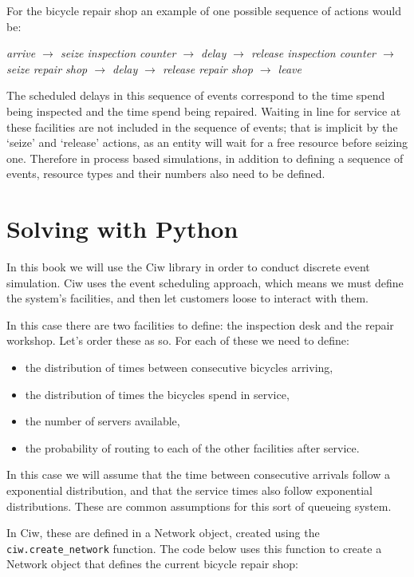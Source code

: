 For the bicycle repair shop an example of one possible sequence of actions would
be:

\textit{arrive $\rightarrow$ seize inspection counter $\rightarrow$ delay $\rightarrow$ release inspection counter $\rightarrow$ seize repair shop $\rightarrow$ delay $\rightarrow$ release repair shop $\rightarrow$ leave}

The scheduled delays in this sequence of events correspond to the time spend
being inspected and the time spend being repaired. Waiting in line for service
at these facilities are not included in the sequence of events; that is implicit
by the `seize' and `release' actions, as an entity will wait for a free resource
before seizing one.
Therefore in process based simulations, in addition to defining a sequence of
events, resource types and their numbers also need to be defined.


\section{Solving with Python}\label{sec:solving-with-python}

In this book we will use the Ciw library in order to conduct discrete event
simulation.
Ciw uses the event scheduling approach, which means we must define the system's
facilities, and then let customers loose to interact with them.

In this case there are two facilities to define: the inspection desk and the
repair workshop. Let's order these as so. For each of these we need to define:

\begin{itemize}
  \item the distribution of times between consecutive bicycles arriving,
  \item the distribution of times the bicycles spend in service,
  \item the number of servers available,
  \item the probability of routing to each of the other facilities after
  service.
\end{itemize}

In this case we will assume that the time between consecutive arrivals follow a
exponential distribution, and that the service times also follow exponential
distributions. These are common assumptions for this sort of queueing system.

In Ciw, these are defined in a Network object, created using the
\texttt{ciw.create_network} function. The code below uses this
function to create a Network object that defines the current bicycle repair
shop:


